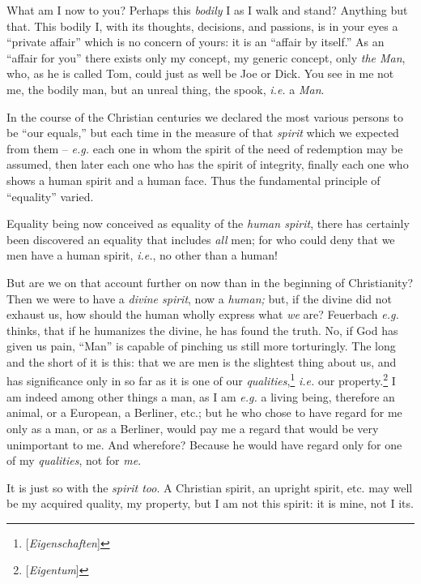 What am I now to you? Perhaps this \textit{bodily} I as I walk and stand? 
Anything but that. This bodily I, with its thoughts, decisions, and passions, 
is in your eyes a ``private affair'' which is no concern of yours: it is an 
``affair by itself.'' As an ``affair for you'' there exists only my 
concept, my generic concept, only \textit{the Man}, who, as he is called Tom, 
could just as well be Joe or Dick. You see in me not me, the bodily man, but 
an unreal thing, the spook, \textit{i.e.} a \textit{Man}.

In the course of the Christian centuries we declared the most various persons 
to be ``our equals,'' but each time in the measure of that \textit{spirit} 
which we expected from them -- \textit{e.g.} each one in whom the spirit of 
the need of redemption may be assumed, then later each one who has the spirit 
of integrity, finally each one who shows a human spirit and a human face. Thus 
the fundamental principle of ``equality'' varied.

 Equality being now conceived as equality of the \textit{human spirit}, there 
has certainly been discovered an equality that includes \textit{all} men; for 
who could deny that we men have a human spirit, \textit{i.e.}, no other than 
a human!

But are we on that account further on now than in the beginning of 
Christianity? Then we were to have a \textit{divine spirit}, now a 
\textit{human;} but, if the divine did not exhaust us, how should the human 
wholly express what \textit{we} are? Feuerbach \textit{e.g.} thinks, that if 
he humanizes the divine, he has found the truth. No, if God has given us pain, 
``Man'' is capable of pinching us still more torturingly. The long and the 
short of it is this: that we are men is the slightest thing about us, and has 
significance only in so far as it is one of our 
\textit{qualities},\footnote{[\textit{Eigenschaften}]} \textit{i.e.} our 
property.\footnote{[\textit{Eigentum}]} I am indeed among other things a man, 
as I am \textit{e.g.} a living being, therefore an animal, or a European, a 
Berliner, etc.; but he who chose to have regard for me only as a man, or as a 
Berliner, would pay me a regard that would be very unimportant to me. And 
wherefore? Because he would have regard only for one of my \textit{qualities}, 
not for \textit{me}.

It is just so with the \textit{spirit too}. A Christian spirit, an upright 
spirit, etc. may well be my acquired quality, my property, but I am not this 
spirit: it is mine, not I its.

